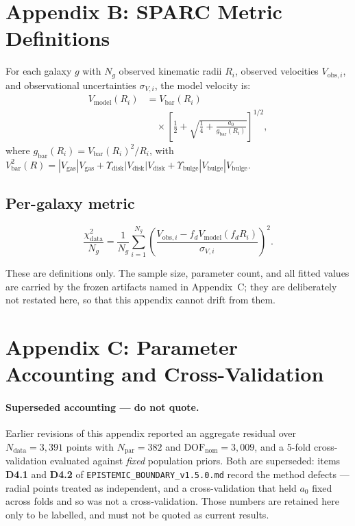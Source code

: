 \section*{Appendix B: SPARC Metric Definitions}
\label{app:sparc_metrics}

For each galaxy $g$ with $N_g$ observed kinematic radii $R_i$, observed velocities
$V_{\text{obs},i}$, and observational uncertainties $\sigma_{V,i}$, the model velocity is:
\begin{equation}
\begin{aligned}
V_{\text{model}}(R_i) &= V_{\text{bar}}(R_i) \\
&\quad \times \left[ \frac{1}{2} + \sqrt{\frac{1}{4} + \frac{a_0}{g_{\text{bar}}(R_i)}} \right]^{1/2},
\end{aligned}
\end{equation}
where $g_{\text{bar}}(R_i) = V_{\text{bar}}(R_i)^2 / R_i$, with
$V_{\text{bar}}^2(R) = |V_{\text{gas}}|V_{\text{gas}} + \Upsilon_{\text{disk}} |V_{\text{disk}}|V_{\text{disk}} + \Upsilon_{\text{bulge}} |V_{\text{bulge}}|V_{\text{bulge}}$.

\subsection*{Per-galaxy metric}
\begin{equation}
\frac{\chi^2_{\text{data}}}{N_g} = \frac{1}{N_g} \sum_{i=1}^{N_g} \left( \frac{V_{\text{obs},i} - f_d V_{\text{model}}(f_d R_i)}{\sigma_{V,i}} \right)^2.
\end{equation}

These are definitions only. The sample size, parameter count, and all fitted values are carried
by the frozen artifacts named in Appendix~C; they are deliberately not restated here, so that
this appendix cannot drift from them.

\section*{Appendix C: Parameter Accounting and Cross-Validation}
\label{app:param_derivation}

\paragraph{Superseded accounting --- do not quote.}
Earlier revisions of this appendix reported an aggregate residual over
$N_{\text{data}} = 3{,}391$ points with $N_{\text{par}} = 382$ and
$\text{DOF}_{\text{nom}} = 3{,}009$, and a 5-fold cross-validation evaluated against
\emph{fixed} population priors. Both are superseded: items \textbf{D4.1} and \textbf{D4.2} of
\texttt{EPISTEMIC\_BOUNDARY\_v1.5.0.md} record the method defects --- radial points treated as
independent, and a cross-validation that held $a_0$ fixed across folds and so was not a
cross-validation. Those numbers are retained here only to be labelled, and must not be quoted
as current results.

